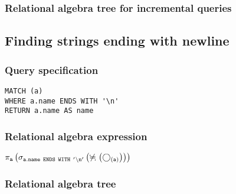 \subsubsection*{Relational algebra tree for incremental queries}


\subsection{Finding strings ending with newline}

\subsubsection*{Query specification}

\begin{lstlisting}
MATCH (a)
WHERE a.name ENDS WITH '\n'
RETURN a.name AS name
\end{lstlisting}

\subsubsection*{Relational algebra expression}

$\projection{\var{a}} \left(\selection{\mathtt{a.name~ENDS~WITH~'\backslash{}n'}} \left(\alldifferent{} \left(\getvertices{a}{}\right)\right)\right)$

\subsubsection*{Relational algebra tree}


